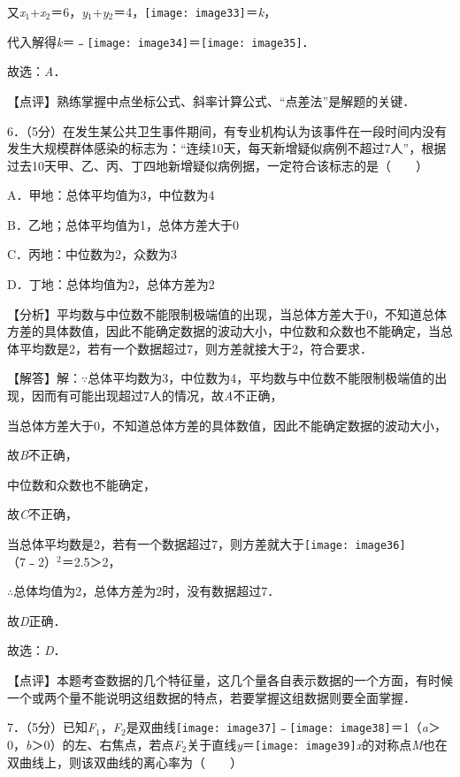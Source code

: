 \documentclass[a4paper,11pt,UTF8,twoside]{ctexart} %
\begin{document}
又\textit{x}${}_{1}$+\textit{x}${}_{2}$＝6，\textit{y}${}_{1}$+\textit{y}${}_{2}$＝4，\texttt{[image: image33]}＝\textit{k}，

代入解得\textit{k}＝﹣\texttt{[image: image34]}＝\texttt{[image: image35]}．

故选：\textit{A}．

【点评】熟练掌握中点坐标公式、斜率计算公式、``点差法''是解题的关键．

6．（5分）在发生某公共卫生事件期间，有专业机构认为该事件在一段时间内没有发生大规模群体感染的标志为：``连续10天，每天新增疑似病例不超过7人''，根据过去10天甲、乙、丙、丁四地新增疑似病例据，一定符合该标志的是（　　）

A．甲地：总体平均值为3，中位数为4 

B．乙地；总体平均值为1，总体方差大于0 

C．丙地：中位数为2，众数为3 

D．丁地：总体均值为2，总体方差为2

【分析】平均数与中位数不能限制极端值的出现，当总体方差大于0，不知道总体方差的具体数值，因此不能确定数据的波动大小，中位数和众数也不能确定，当总体平均数是2，若有一个数据超过7，则方差就接大于2，符合要求．

【解答】解：$\mathrm{\because}$总体平均数为3，中位数为4，平均数与中位数不能限制极端值的出现，因而有可能出现超过7人的情况，故\textit{A}不正确，

当总体方差大于0，不知道总体方差的具体数值，因此不能确定数据的波动大小，

故\textit{B}不正确，

中位数和众数也不能确定，

故\textit{C}不正确，

当总体平均数是2，若有一个数据超过7，则方差就大于\texttt{[image: image36]}（7﹣2）${}^{2}$＝2.5＞2，

$\mathrm{\therefore}$总体均值为2，总体方差为2时，没有数据超过7．

故\textit{D}正确．

故选：\textit{D}．

【点评】本题考查数据的几个特征量，这几个量各自表示数据的一个方面，有时候一个或两个量不能说明这组数据的特点，若要掌握这组数据则要全面掌握．

7．（5分）已知\textit{F}${}_{1}$，\textit{F}${}_{2}$是双曲线\texttt{[image: image37]}﹣\texttt{[image: image38]}＝1（\textit{a}＞0，\textit{b}＞0）的左、右焦点，若点\textit{F}${}_{2}$关于直线\textit{y}＝\texttt{[image: image39]}\textit{x}的对称点\textit{M}也在双曲线上，则该双曲线的离心率为（　　）
\end{document}
